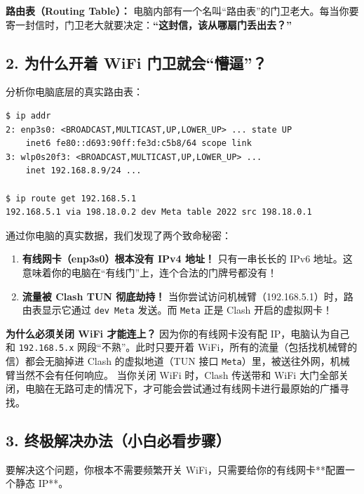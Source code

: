 \documentclass[12pt,a4paper]{ctexart}
\begin{document}
\textbf{路由表（Routing Table）：}
电脑内部有一个名叫“路由表”的门卫老大。每当你要寄一封信时，门卫老大就要决定：\textbf{“这封信，该从哪扇门丢出去？”}

\subsection{2. 为什么开着 WiFi 门卫就会“懵逼”？}

分析你电脑底层的真实路由表：
\begin{lstlisting}[style=terminal]
$ ip addr
2: enp3s0: <BROADCAST,MULTICAST,UP,LOWER_UP> ... state UP
    inet6 fe80::d693:90ff:fe3d:c5b8/64 scope link 
3: wlp0s20f3: <BROADCAST,MULTICAST,UP,LOWER_UP> ...
    inet 192.168.8.9/24 ...

$ ip route get 192.168.5.1
192.168.5.1 via 198.18.0.2 dev Meta table 2022 src 198.18.0.1
\end{lstlisting}

\begin{tcolorbox}[colback=red!5,colframe=red!75!black,title=案发现场：门卫与 Clash 的连环套,fonttitle=\bfseries,boxrule=0.5pt,arc=3mm]
通过你电脑的真实数据，我们发现了两个致命秘密：
\begin{enumerate}
    \item \textbf{有线网卡（enp3s0）根本没有 IPv4 地址！} 只有一串长长的 IPv6 地址。这意味着你的电脑在“有线门”上，连个合法的门牌号都没有！
    \item \textbf{流量被 Clash TUN 彻底劫持！} 当你尝试访问机械臂（192.168.5.1）时，路由表显示它通过 \texttt{dev Meta} 发送。而 \texttt{Meta} 正是 Clash 开启的虚拟网卡！
\end{enumerate}
\end{tcolorbox}

\textbf{为什么必须关闭 WiFi 才能连上？}
因为你的有线网卡没有配 IP，电脑认为自己和 \texttt{192.168.5.x} 网段“不熟”。此时只要开着 WiFi，所有的流量（包括找机械臂的信）都会无脑掉进 Clash 的虚拟地道（TUN 接口 \texttt{Meta}）里，被送往外网，机械臂当然不会有任何响应。
当你关闭 WiFi 时，Clash 传送带和 WiFi 大门全部关闭，电脑在无路可走的情况下，才可能会尝试通过有线网卡进行最原始的广播寻找。

\subsection{3. 终极解决办法（小白必看步骤）}

要解决这个问题，你根本不需要频繁开关 WiFi，只需要给你的有线网卡**配置一个静态 IP**。
\end{document}
